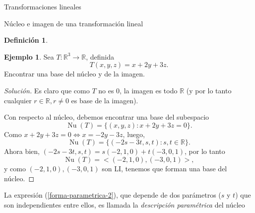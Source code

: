 \documentclass[a4paper,12pt,twoside,spanish,reqno]{amsbook}
\theoremstyle{definition}
\newtheorem{definicion}{Definici\'on}[section]
\newtheorem{ejemplo}{Ejemplo}[section]
\theoremstyle{remark}
\newcommand{\nuc}{\operatorname{Nu}}
\newcommand{\R}{\mathbb R}
\begin{document}
\begin{chapter}{Transformaciones lineales}
\begin{section}{Núcleo e imagen de una transformación lineal}
\begin{definicion}
        \end{definicion}
                
        \begin{ejemplo}
            Sea $T: \R^3 \to \R$, definida
            $$
            T(x,y,z) = x +2y +3z.
            $$
            Encontrar una base del núcleo y de la imagen.
            \begin{proof}[Solución]
                Es claro que como $T$ no es 0, la imagen es todo $\R$ (y por lo tanto cualquier $r\in \R, r \ne 0$ es base de la imagen). 
                
                Con respecto al núcleo,  debemos encontrar una base del subespacio
                $$
                \nuc(T) = \{(x,y,z): x+2y+3z =0\}.
                $$
                Como $x+2y+3z =0 \Leftrightarrow x = -2y-3z$, luego, 
                \begin{equation}\label{forma-parametrica-2}
                    \nuc(T) =  \{(-2s-3t,s,t): s,t \in \R\}.
                \end{equation}
                Ahora bien, $(-2s-3t,s,t) = s(-2,1,0)+t(-3,0,1)$, por lo tanto 
                \begin{equation*}
                \nuc(T) =  <(-2,1,0),(-3,0,1)>,
                \end{equation*}
                y  como $(-2,1,0),(-3,0,1)$ son LI, tenemos que forman una base del núcleo. 
            \end{proof}
        
        La expresión (\ref{forma-parametrica-2}),  que depende de dos parámetros ($s$ y $t$) que son independientes entre ellos, es llamada la \textit{descripción paramétrica} del núcleo	
        \end{ejemplo}
        

\end{section}
\end{chapter}
\end{document}
